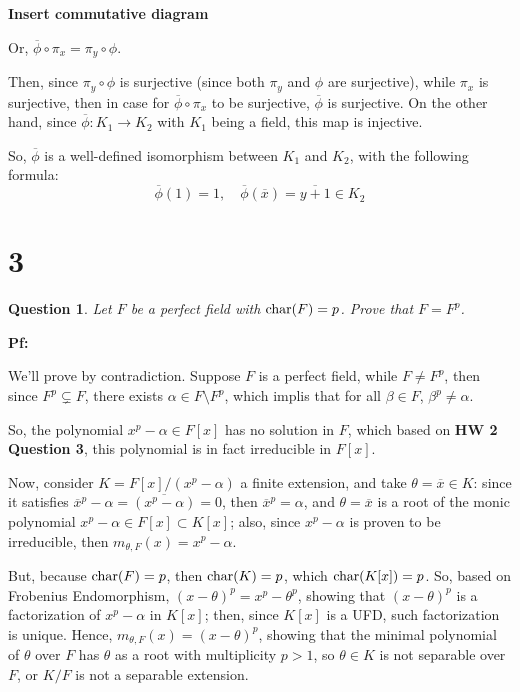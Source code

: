 \documentclass{article}
\newtheorem{question}{Question}
\begin{document}
\textbf{Insert commutative diagram}

Or, $\overline{\phi}\circ \pi_x = \pi_y\circ \phi$.

Then, since $\pi_y\circ\phi$ is surjective (since both $\pi_y$ and $\phi$ are surjective), while $\pi_x$ is surjective, then in case for $\overline{\phi}\circ \pi_x$ to be surjective, $\overline{\phi}$ is surjective. On the other hand, since $\overline{\phi}:K_1\rightarrow K_2$ with $K_1$ being a field, this map is injective. 

So, $\overline{\phi}$ is a well-defined isomorphism between $K_1$ and $K_2$, with the following formula:
$$\overline{\phi}(1)=1,\quad \overline{\phi}(\overline{x}) = \overline{y+1}\in K_2$$

\break

\section*{3}
\begin{myBox}[]{}
    \begin{question}
        Let $F$ be a perfect field with $\textmd{char}(F)=p$. Prove that $F=F^p$.
    \end{question}
\end{myBox}

\textbf{Pf:}

We'll prove by contradiction. Suppose $F$ is a perfect field, while $F\neq F^p$, then since $F^p\subsetneq F$, there exists $\alpha\in F\setminus F^p$, which implis that for all $\beta\in F$, $\beta^p\neq \alpha$.

So, the polynomial $x^p-\alpha \in F[x]$ has no solution in $F$, which based on \textbf{HW 2 Question 3}, this polynomial is in fact irreducible in $F[x]$.

\hfil

Now, consider $K=F[x]/(x^p-\alpha)$ a finite extension, and take $\theta=\overline{x}\in K$: since it satisfies $\overline{x}^p-\alpha = \overline{(x^p-\alpha)}=0$, then $\overline{x}^p=\alpha$, and $\theta = \overline{x}$ is a root of the monic polynomial $x^p-\alpha\in F[x]\subset K[x]$; also, since $x^p-\alpha$ is proven to be irreducible, then $m_{\theta,F}(x)=x^p-\alpha$.

But, because $\textmd{char}(F)=p$, then $\textmd{char}(K)=p$, which $\textmd{char}(K[x])=p$. So, based on Frobenius Endomorphism, $(x-\theta)^p = x^p-\theta^p$, showing that $(x-\theta)^p$ is a factorization of $x^p-\alpha$ in $K[x]$; then, since $K[x]$ is a UFD, such factorization is unique. Hence, $m_{\theta,F}(x) = (x-\theta)^p$, showing that the minimal polynomial of $\theta$ over $F$ has $\theta$ as a root with multiplicity $p>1$, so $\theta\in K$ is not separable over $F$, or $K/F$ is not a separable extension.
\end{document}
